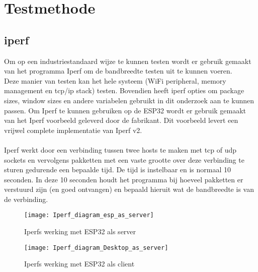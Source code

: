 \documentclass[../DCM2_Verslag.tex]{subfiles}
\begin{document}
\section{Testmethode}
\subsection{iperf}
Om op een industriestandaard wijze te kunnen testen wordt er gebruik gemaakt van het programma Iperf om de bandbreedte testen uit te kunnen voeren.\\
Deze manier van testen kan het hele systeem (WiFi peripheral, memory management en tcp/ip stack) testen. Bovendien heeft iperf opties om package sizes, window sizes en andere variabelen gebruikt in dit onderzoek aan te kunnen passen. Om Iperf te kunnen gebruiken op de ESP32 wordt er gebruik gemaakt van het Iperf voorbeeld geleverd door de fabrikant. Dit voorbeeld levert een vrijwel complete implementatie van Iperf v2.\\\\
Iperf werkt door een verbinding tussen twee hosts te maken met tcp of udp sockets en vervolgens pakketten met een vaste grootte over deze verbinding te sturen gedurende een bepaalde tijd. De tijd is instelbaar en is normaal 10 seconden. In deze 10 seconden houdt het programma bij hoeveel pakketten er verstuurd zijn (en goed ontvangen) en bepaald hieruit wat de bandbreedte is van de verbinding.\\
\begin{figure}[h]
\texttt{[image: Iperf\_diagram\_esp\_as\_server]}
\caption{Iperfs werking met ESP32 als server}
\end{figure}
\begin{figure}[h]
\texttt{[image: Iperf\_diagram\_Desktop\_as\_server]}
\caption{Iperfs werking met ESP32 als client}
\end{figure}
\end{document}

